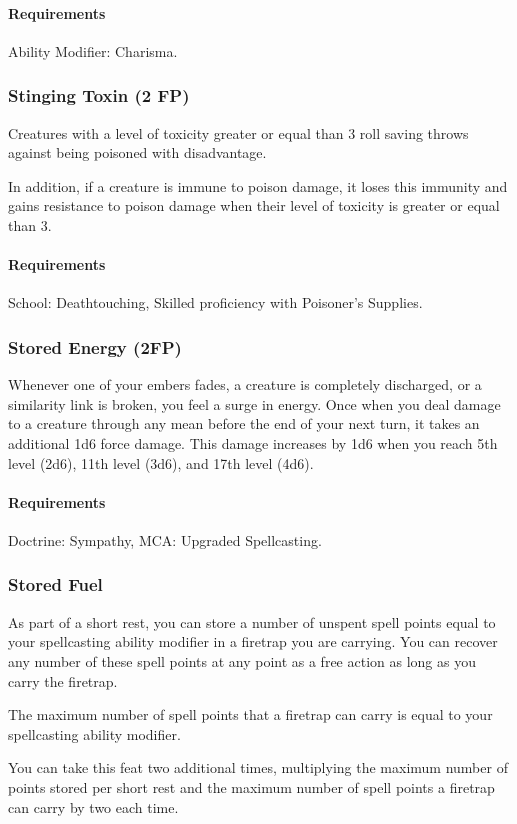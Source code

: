     \paragraph{Requirements} Ability Modifier: Charisma.
\subsubsection{Stinging Toxin (2 FP)} \label{feat::stingingtoxin}
    Creatures with a level of toxicity greater or equal than 3 roll saving throws against being poisoned with disadvantage.

    In addition, if a creature is immune to poison damage, it loses this immunity and gains resistance to poison damage when their level of toxicity is greater or equal than 3.
    \paragraph{Requirements} School: Deathtouching, Skilled proficiency with Poisoner's Supplies.
\subsubsection{Stored Energy (2FP)} \label{feat::storedenergy}
    Whenever one of your embers fades, a creature is completely discharged, or a similarity link is broken, you feel a surge in energy.
    Once when you deal damage to a creature through any mean before the end of your next turn, it takes an additional 1d6 force damage.
    This damage increases by 1d6 when you reach 5th level (2d6), 11th level (3d6), and 17th level (4d6).
    \paragraph{Requirements} Doctrine: Sympathy, MCA: Upgraded Spellcasting.
\subsubsection{Stored Fuel} \label{feat::storedfuel}
    As part of a short rest, you can store a number of unspent spell points equal to your spellcasting ability modifier in a firetrap you are carrying.
    You can recover any number of these spell points at any point as a free action as long as you carry the firetrap.

    The maximum number of spell points that a firetrap can carry is equal to your spellcasting ability modifier.

    You can take this feat two additional times, multiplying the maximum number of points stored per short rest and the maximum number of spell points a firetrap can carry by two each time.
